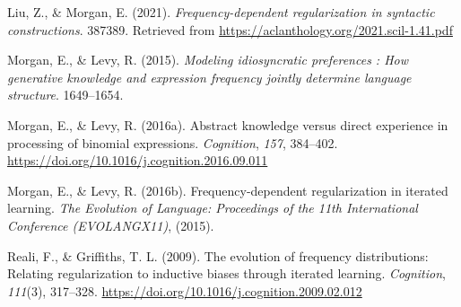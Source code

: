 \documentclass[
  jou,floatsintext]{apa6}
\newlength{\cslhangindent}
\newenvironment{CSLReferences}[2] %
 {\begin{list}{}{%
  \setlength{\itemindent}{0pt}
  \setlength{\leftmargin}{0pt}
  \setlength{\parsep}{0pt}
  \ifodd #1
   \setlength{\leftmargin}{\cslhangindent}
   \setlength{\itemindent}{-1\cslhangindent}
  \fi
  \setlength{\itemsep}{#2\baselineskip}}}
 {\end{list}}
\begin{document}
\begin{CSLReferences}{1}{0}
Liu, Z., \& Morgan, E. (2021). \emph{Frequency-dependent regularization in syntactic constructions}. 387389. Retrieved from \url{https://aclanthology.org/2021.scil-1.41.pdf}

Morgan, E., \& Levy, R. (2015). \emph{Modeling idiosyncratic preferences : How generative knowledge and expression frequency jointly determine language structure}. 1649--1654.

Morgan, E., \& Levy, R. (2016a). Abstract knowledge versus direct experience in processing of binomial expressions. \emph{Cognition}, \emph{157}, 384--402. \url{https://doi.org/10.1016/j.cognition.2016.09.011}

Morgan, E., \& Levy, R. (2016b). Frequency-dependent regularization in iterated learning. \emph{The Evolution of Language: Proceedings of the 11th International Conference (EVOLANGX11)}, (2015).

Reali, F., \& Griffiths, T. L. (2009). The evolution of frequency distributions: Relating regularization to inductive biases through iterated learning. \emph{Cognition}, \emph{111}(3), 317--328. \url{https://doi.org/10.1016/j.cognition.2009.02.012}

\end{CSLReferences}
\end{document}

